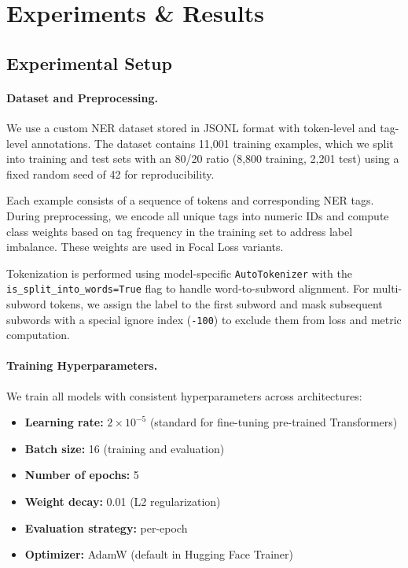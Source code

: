 \section{Experiments \& Results}

\subsection{Experimental Setup}

\paragraph{Dataset and Preprocessing.}
We use a custom NER dataset stored in JSONL format with token-level and tag-level annotations.
The dataset contains 11,001 training examples, which we split into training and test sets with an 80/20 ratio
(8,800 training, 2,201 test) using a fixed random seed of 42 for reproducibility.

Each example consists of a sequence of tokens and corresponding NER tags. During preprocessing, we encode
all unique tags into numeric IDs and compute class weights based on tag frequency in the training set to
address label imbalance. These weights are used in Focal Loss variants.

Tokenization is performed using model-specific \texttt{AutoTokenizer} with the \texttt{is\_split\_into\_words=True}
flag to handle word-to-subword alignment. For multi-subword tokens, we assign the label to the first subword
and mask subsequent subwords with a special ignore index (\texttt{-100}) to exclude them from loss and metric computation.

\paragraph{Training Hyperparameters.}
We train all models with consistent hyperparameters across architectures:
\begin{itemize}
  \item \textbf{Learning rate:} $2 \times 10^{-5}$ (standard for fine-tuning pre-trained Transformers)
  \item \textbf{Batch size:} 16 (training and evaluation)
  \item \textbf{Number of epochs:} 5
  \item \textbf{Weight decay:} 0.01 (L2 regularization)
  \item \textbf{Evaluation strategy:} per-epoch
  \item \textbf{Optimizer:} AdamW (default in Hugging Face Trainer)
\end{itemize}

